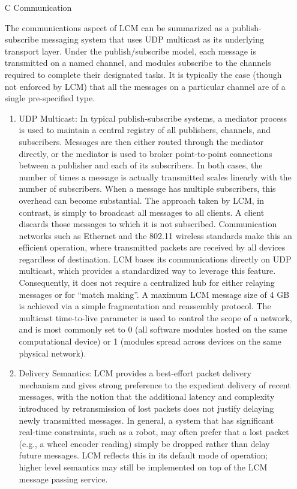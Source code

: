 \begin{itemize}
	\item[C] Communication

	The communications aspect of LCM can be summarized as a publish-subscribe messaging system that uses UDP multicast as its underlying transport layer. Under the publish/subscribe model, each message is transmitted on a named channel, and modules subscribe to the channels required to complete their designated tasks. It is typically the case (though not enforced by LCM) that all the messages on a particular channel are of a single pre-specified type.
		\begin{enumerate}
		\item 
		UDP Multicast: In typical publish-subscribe systems, a mediator process is used to maintain a central registry of all publishers, channels, and subscribers. Messages are then either routed through the mediator directly, or the mediator is used to broker point-to-point connections between a publisher and each of its subscribers. In both cases, the number of times a message is actually transmitted scales linearly with the number of subscribers. When a message has multiple subscribers, this overhead can become substantial. The approach taken by LCM, in contrast, is simply to broadcast all messages to all clients. A client discards those messages to which it is not subscribed. Communication networks such as Ethernet and the 802.11 wireless standards make this an efficient operation, where transmitted packets are received by all devices regardless of destination.
		LCM bases its communications directly on UDP multicast, which provides a standardized way to leverage this feature. Consequently, it does not require a centralized hub for either relaying messages or for “match making”. A maximum LCM message size of 4 GB is achieved via a simple fragmentation and reassembly protocol. The multicast time-to-live parameter is used to control the scope of a network, and is most commonly set to 0 (all software modules hosted on the same computational device) or 1 (modules spread across devices on the same physical network). 
		\item
		Delivery Semantics: LCM provides a best-effort packet delivery mechanism and gives strong preference to the expedient delivery of recent messages, with the notion that the additional latency and complexity introduced by retransmission of lost packets does not justify delaying newly transmitted messages.
		In general, a system that has significant real-time constraints, such as a robot, may often prefer that a lost packet (e.g., a wheel encoder reading) simply be dropped rather than delay future messages. LCM reflects this in its default mode of operation; higher level semantics may still be implemented on top of the LCM message passing service.
		\end{enumerate}
	\end{itemize}


